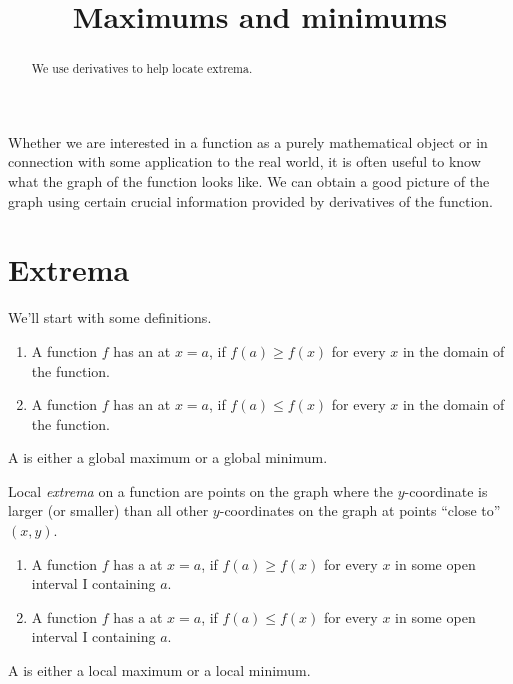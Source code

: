 \documentclass{ximera}
\title[Dig-In]{Maximums and minimums}
\begin{document}
\begin{abstract}
We use derivatives to help locate extrema.  
\end{abstract}
\maketitle


Whether we are interested in a function as a purely mathematical
object or in connection with some application to the real world, it is
often useful to know what the graph of the function looks like. We can
obtain a good picture of the graph using certain crucial information
provided by derivatives of the function.


\section{Extrema}
We'll start with some definitions.
\begin{definition}\hfil{}
\begin{enumerate}
\item A function $f$ has an  at $x=a$, if $f(a)\ge
  f(x)$ for every $x$ in the domain of the function.
\item A function $f$ has an  at $x=a$, if $f(a)\le
  f(x)$ for every $x$ in the domain of the function.
\end{enumerate} 
A  is either a
global maximum or a global minimum.
\end{definition}

Local \textit{extrema} on a function are points on the graph where the
$y$-coordinate is larger (or smaller) than all other $y$-coordinates
on the graph at points ``close to'' $(x,y)$. 

\begin{definition}\hfil{}
\begin{enumerate}
\item A function $f$ has a  at $x=a$, if $f(a)\ge
  f(x)$ for every $x$ in some open interval I containing $a$.
\item A function $f$ has a  at $x=a$, if $f(a)\le
  f(x)$ for every $x$  in some open interval I containing $a$.
\end{enumerate}
A  is either a local
maximum or a local minimum.
\end{definition}
\end{document}

